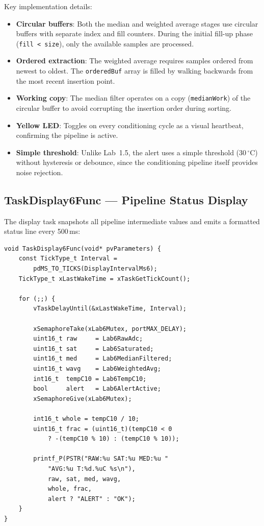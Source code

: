 \documentclass[12pt]{article}
\begin{document}
Key implementation details:
\begin{itemize}
  \item \textbf{Circular buffers}: Both the median and weighted average stages use circular buffers with separate index and fill counters. During the initial fill-up phase (\texttt{fill < size}), only the available samples are processed.
  \item \textbf{Ordered extraction}: The weighted average requires samples ordered from newest to oldest. The \texttt{orderedBuf} array is filled by walking backwards from the most recent insertion point.
  \item \textbf{Working copy}: The median filter operates on a copy (\texttt{medianWork}) of the circular buffer to avoid corrupting the insertion order during sorting.
  \item \textbf{Yellow LED}: Toggles on every conditioning cycle as a visual heartbeat, confirming the pipeline is active.
  \item \textbf{Simple threshold}: Unlike Lab~1.5, the alert uses a simple threshold (30\,$^{\circ}$C) without hysteresis or debounce, since the conditioning pipeline itself provides noise rejection.
\end{itemize}

\subsection{TaskDisplay6Func --- Pipeline Status Display}

The display task snapshots all pipeline intermediate values and emits a formatted status line every 500\,ms:

\begin{lstlisting}[caption={TaskDisplay6Func --- periodic pipeline status display}]
void TaskDisplay6Func(void* pvParameters) {
    const TickType_t Interval =
        pdMS_TO_TICKS(DisplayIntervalMs6);
    TickType_t xLastWakeTime = xTaskGetTickCount();

    for (;;) {
        vTaskDelayUntil(&xLastWakeTime, Interval);

        xSemaphoreTake(xLab6Mutex, portMAX_DELAY);
        uint16_t raw     = Lab6RawAdc;
        uint16_t sat     = Lab6Saturated;
        uint16_t med     = Lab6MedianFiltered;
        uint16_t wavg    = Lab6WeightedAvg;
        int16_t  tempC10 = Lab6TempC10;
        bool     alert   = Lab6AlertActive;
        xSemaphoreGive(xLab6Mutex);

        int16_t whole = tempC10 / 10;
        uint16_t frac = (uint16_t)(tempC10 < 0
            ? -(tempC10 % 10) : (tempC10 % 10));

        printf_P(PSTR("RAW:%u SAT:%u MED:%u "
            "AVG:%u T:%d.%uC %s\n"),
            raw, sat, med, wavg,
            whole, frac,
            alert ? "ALERT" : "OK");
    }
}
\end{lstlisting}
\end{document}
